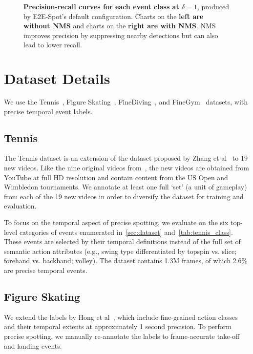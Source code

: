 \documentclass[runningheads]{llncs}
\newcommand{\notation}[1]{\ensuremath{#1}\xspace}
\newcommand{\OURMETHOD}{{E2E-Spot}\xspace}
\newcommand{\finegym}{{FineGym}\xspace}
\newcommand{\finediving}{{FineDiving}\xspace}
\newcommand{\Tolerance}{\notation{\delta}}
\begin{document}
\begin{figure*}[p]
    \caption{
        {\bf Precision-recall curves for each event class at $\Tolerance = 1$}, produced by \OURMETHOD's default configuration. Charts on the {\bf left are without NMS} and charts on the {\bf right are with NMS}.
        NMS improves precision by suppressing nearby detections but can also lead to lower recall.
    }
    \label{fig:supp_pr_curves}
\end{figure*}  
\section{Dataset Details}
\label{sec:supp_dataset}

We use the Tennis~\cite{vid2player}, Figure Skating~\cite{vpd}, \finediving~\cite{finediving}, and \finegym~\cite{finegym} datasets, with precise temporal event labels.

\subsection{Tennis}

The Tennis dataset is an extension of the dataset proposed by Zhang et al~\cite{vid2player} to 19 new videos.
Like the nine original videos from~\cite{vid2player}, the new videos are obtained from YouTube at full HD resolution and contain content from the US Open and Wimbledon tournaments.
We annotate at least one full `set' (a unit of gameplay) from each of the 19 new videos in order to diversify the dataset for training and evaluation.

To focus on the temporal aspect of precise spotting, we evaluate on the six top-level categories of events enumerated in~\autoref{sec:dataset} and~\autoref{tab:tennis_class}.
These events are selected by their temporal definitions instead of the full set of semantic action attributes (e.g., swing type differentiated by topspin vs. slice; forehand vs. backhand; volley).
The dataset contains 1.3M frames, of which 2.6\% are precise temporal events.

\subsection{Figure Skating}
\label{sub:supp_fs_dataset}

We extend the labels by Hong et al~\cite{vpd}, which include fine-grained action classes and their temporal extents at approximately 1 second precision.
To perform precise spotting, we manually re-annotate the labels to frame-accurate take-off and landing events.
\end{document}
